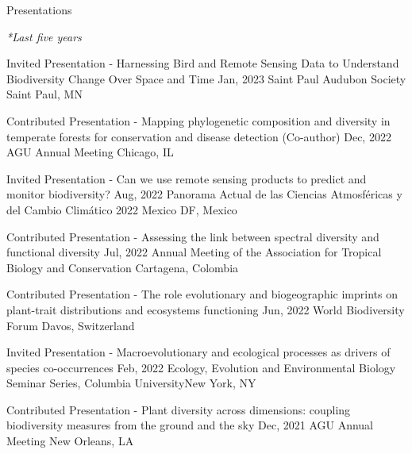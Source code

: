 \documentclass{resume} %
\begin{document}
\begin{rSection}{Presentations} 
\normalfont 

\em{*Last five years}

\begin{sSubsection}{Invited Presentation - Harnessing Bird and Remote Sensing Data to Understand Biodiversity Change Over Space and Time}{ \hfill }{Jan, 2023}{ Saint Paul Audubon Society }{Saint Paul, MN}
\end{sSubsection}

\begin{sSubsection}{Contributed Presentation - Mapping phylogenetic composition and diversity in temperate forests for conservation and disease detection}{ (Co-author) }{Dec, 2022}{ AGU Annual Meeting }{Chicago, IL}
\end{sSubsection}

\begin{sSubsection}{Invited Presentation - Can we use remote sensing products to predict and monitor biodiversity?}{ \hfill }{Aug, 2022}{ Panorama Actual de las Ciencias Atmosféricas y del Cambio Climático 2022 }{Mexico DF, Mexico}
\end{sSubsection}

\begin{sSubsection}{Contributed Presentation - Assessing the link between spectral diversity and functional diversity}{ \hfill }{Jul, 2022}{ Annual Meeting of the Association for Tropical Biology and Conservation }{Cartagena, Colombia}
\end{sSubsection}

\begin{sSubsection}{Contributed Presentation - The role evolutionary and biogeographic imprints on plant-trait distributions and ecosystems functioning}{ \hfill }{Jun, 2022}{ World Biodiversity Forum }{Davos, Switzerland}
\end{sSubsection}

\begin{sSubsection}{Invited Presentation - Macroevolutionary and ecological processes as drivers of species co-occurrences}{ \hfill }{Feb, 2022}{ Ecology, Evolution and Environmental Biology Seminar Series, Columbia University}{New York, NY}
\end{sSubsection}

\begin{sSubsection}{Contributed Presentation - Plant diversity across dimensions: coupling biodiversity measures from the ground and the sky}{ \hfill }{Dec, 2021}{ AGU Annual Meeting }{New Orleans, LA}
\end{sSubsection}


\end{rSection}
\end{document}
